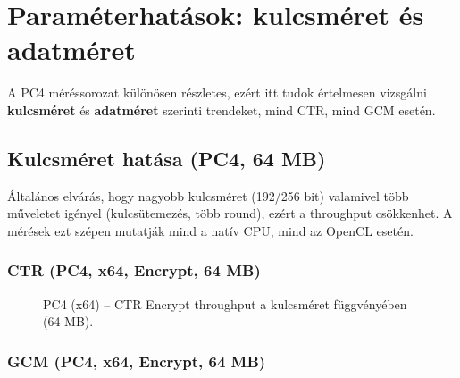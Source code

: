 \chapter{Paraméterhatások: kulcsméret és adatméret}

A PC4 méréssorozat különösen részletes, ezért itt tudok értelmesen vizsgálni
\textbf{kulcsméret} és \textbf{adatméret} szerinti trendeket, mind CTR, mind GCM esetén.

\section{Kulcsméret hatása (PC4, 64 MB)}

Általános elvárás, hogy nagyobb kulcsméret (192/256 bit) valamivel több műveletet igényel
(kulcsütemezés, több round), ezért a throughput csökkenhet. A mérések ezt szépen mutatják
mind a natív CPU, mind az OpenCL esetén.

\subsection{CTR (PC4, x64, Encrypt, 64 MB)}

\begin{figure}[h!]
  \centering
  \caption{PC4 (x64) -- CTR Encrypt throughput a kulcsméret függvényében (64 MB).}
\end{figure}

\subsection{GCM (PC4, x64, Encrypt, 64 MB)}

